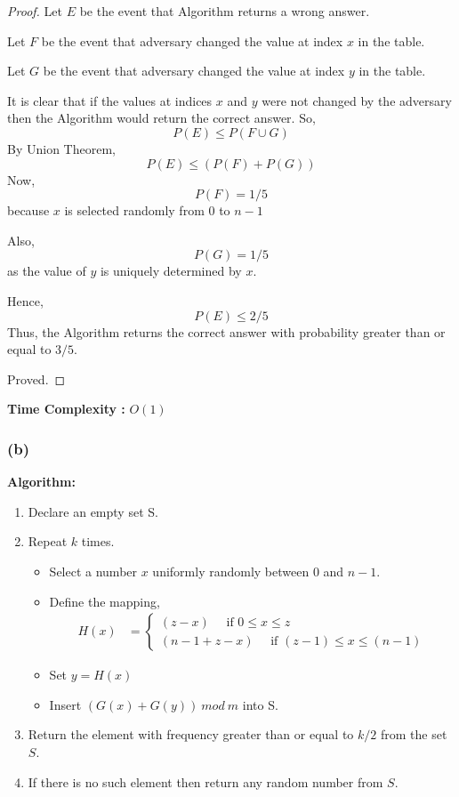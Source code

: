 \documentclass[a4paper]{article}
\begin{document}
\begin{proof}
Let $E$ be the event that Algorithm returns a wrong answer.

Let $F$ be the event that adversary changed the value at index $x$ in the table.

Let $G$ be the event that adversary changed the value at index $y$ in the table.

It is clear that if the values at indices $x$ and $y$ were not changed by the adversary then the Algorithm would return the correct answer.
So, $$P(E) \leq P(F \cup G)$$
By Union Theorem, $$P(E) \leq (P(F)+P(G))$$
Now, $$P(F) = 1/5$$ because $x$ is selected randomly from $0$ to $n-1$

Also, $$P(G) = 1/5$$ as the value of $y$ is uniquely determined by $x$.

Hence, $$P(E) \leq 2/5$$
Thus, the Algorithm returns the correct answer with probability greater than or equal to $3/5$.

Proved.
\end{proof}

\textbf{Time Complexity :} $O(1)$

\subsubsection*{(b)}
\textbf{Algorithm:}
\begin{enumerate}
    \item Declare an empty set S.
    \item Repeat $k$ times.
    \begin{itemize}
        \item Select a number $x$ uniformly randomly between $0$ and $n-1$.
        \item Define the mapping, 
\begin{align*}
    H(x) & = \begin{cases}
        (z - x) \quad \text{ if } 0 \leq x \leq z \\
    (n - 1 + z - x) \quad \text{ if } (z-1) \leq x \leq (n-1) 
        \end{cases}
\end{align*}
        \item Set $y = H(x)$ 
        \item Insert $(G(x)+G(y))\ mod\ m$ into S.
    \end{itemize}
    \item Return the element with frequency greater than or equal to $k/2$ from the set $S$.
    \item If there is no such element then return any random number from $S$.
\end{enumerate} 
\begin{warn}
\end{warn}
\end{document}
